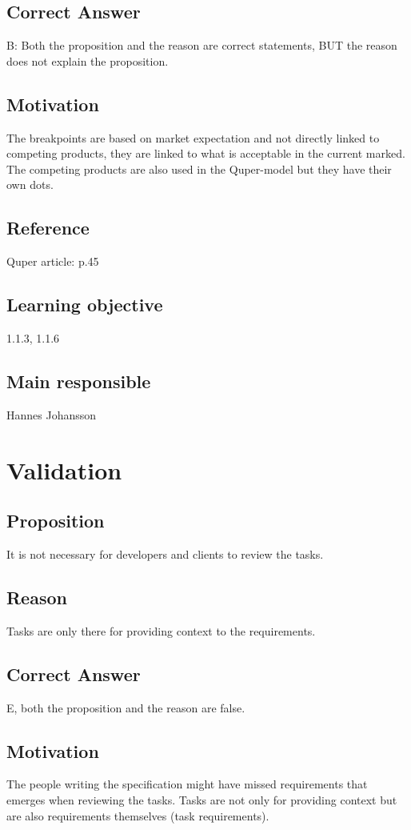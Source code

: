 \documentclass[a4paper]{article}
\begin{document}
\subsection*{Correct Answer}
B: Both the proposition and the reason are correct statements, BUT the reason does not explain the proposition.
\subsection*{Motivation}
The breakpoints are based on market expectation and not directly linked to competing products, they are linked to what is acceptable in the current marked. The competing products are also used in the Quper-model but they have their own dots.
\subsection*{Reference}
Quper article: p.45
\subsection*{Learning objective}
1.1.3, 1.1.6
\subsection*{Main responsible}
Hannes Johansson


\section{Validation}
\subsection*{Proposition}
It is not necessary for developers and clients to review the tasks.
\subsection*{Reason}
Tasks are only there for providing context to the requirements.
\subsection*{Correct Answer}
E, both the proposition and the reason are false.
\subsection*{Motivation}
The people writing the specification might have missed requirements that emerges when reviewing the tasks. Tasks are not only for providing context but are also requirements themselves (task requirements).
\end{document}
